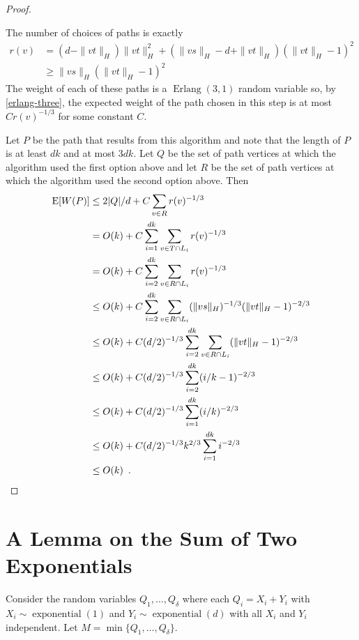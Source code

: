 \documentclass{patmorin}
\DeclareMathOperator{\exponential}{exponential}
\DeclareMathOperator{\erlang}{Erlang}
\begin{document}
\begin{proof}
\begin{enumerate}
    The number of choices of paths is exactly
    \begin{align*}
        r(v) & = (d-\|vt\|_H)\|vt\|_H^2 
               + (\|vs\|_H-d+\|vt\|_H)(\|vt\|_H-1)^2 \\
             & \ge \|vs\|_H(\|vt\|_H-1)^2
    \end{align*}
    The weight of each of these paths is a
    $\erlang(3,1)$ random variable so, by \eqref{erlang-three}, the expected weight of the path
    chosen in this step is at most $Cr(v)^{-1/3}$ for some constant $C$.
\end{enumerate}
Let $P$ be the path that results from this algorithm and note that the
length of $P$ is at least $dk$ and at most $3dk$.  Let $Q$ be the set of
path vertices at which the algorithm used the first option above and let
$R$ be the set of path vertices at which the algorithm used the second
option above.  Then
\begin{align*}
    \mathrm{E}[W(P)] & \le 2|Q|/d + C\sum_{v\in R}r(v)^{-1/3} \\
             & = O(k) + C\sum_{i=1}^{dk}\sum_{v\in T\cap L_i}r(v)^{-1/3} \\
             & = O(k) + C\sum_{i=2}^{dk}\sum_{v\in R\cap L_i}r(v)^{-1/3} \\
             & \le O(k) + C\sum_{i=2}^{dk}\sum_{v\in R\cap L_i}(\|vs\|_H)^{-1/3}(\|vt\|_H-1)^{-2/3} \\
             & \le O(k) + C(d/2)^{-1/3}\sum_{i=2}^{dk}\sum_{v\in R\cap L_i}(\|vt\|_H-1)^{-2/3} \\
             & \le O(k) +  C(d/2)^{-1/3}\sum_{i=2}^{dk}(i/k-1)^{-2/3} \\
             & \le O(k) +  C(d/2)^{-1/3}\sum_{i=1}^{dk}(i/k)^{-2/3} \\
             & \le O(k) +  C(d/2)^{-1/3}k^{2/3}\sum_{i=1}^{dk}i^{-2/3} \\
             & \le O(k) \enspace . \qedhere
\end{align*}
\end{proof}

\section{A Lemma on the Sum of Two Exponentials}

Consider the random variables $Q_1,\ldots,Q_\delta$ where each
$Q_i=X_i+Y_i$ with $X_i\sim\exponential(1)$ and $Y_i\sim\exponential(d)$
with all $X_i$ and $Y_i$ independent.  Let $M=\min\{Q_1,\ldots,Q_\delta\}$.
\end{document}
